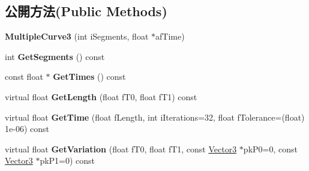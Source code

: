\subsection*{公開方法(Public Methods)}
\begin{DoxyCompactItemize}
\item 
{\bfseries Multiple\+Curve3} (int i\+Segments, float $\ast$af\+Time)\hypertarget{class_magnum_1_1_multiple_curve3_a5ae69e4c6b4875aeac94066085753e32}{}\label{class_magnum_1_1_multiple_curve3_a5ae69e4c6b4875aeac94066085753e32}

\item 
int {\bfseries Get\+Segments} () const \hypertarget{class_magnum_1_1_multiple_curve3_aeac2dfa673e71cad5ff201f934c61839}{}\label{class_magnum_1_1_multiple_curve3_aeac2dfa673e71cad5ff201f934c61839}

\item 
const float $\ast$ {\bfseries Get\+Times} () const \hypertarget{class_magnum_1_1_multiple_curve3_a4c36e2a63268dafb4991299f00a94e8d}{}\label{class_magnum_1_1_multiple_curve3_a4c36e2a63268dafb4991299f00a94e8d}

\item 
virtual float {\bfseries Get\+Length} (float f\+T0, float f\+T1) const \hypertarget{class_magnum_1_1_multiple_curve3_a9aade0b179e52b5bc79334ac36f827ad}{}\label{class_magnum_1_1_multiple_curve3_a9aade0b179e52b5bc79334ac36f827ad}

\item 
virtual float {\bfseries Get\+Time} (float f\+Length, int i\+Iterations=32, float f\+Tolerance=(float) 1e-\/06) const \hypertarget{class_magnum_1_1_multiple_curve3_a30a6194b173e3953996c55ccb3acaba0}{}\label{class_magnum_1_1_multiple_curve3_a30a6194b173e3953996c55ccb3acaba0}

\item 
virtual float {\bfseries Get\+Variation} (float f\+T0, float f\+T1, const \hyperlink{class_magnum_1_1_vector3}{Vector3} $\ast$pk\+P0=0, const \hyperlink{class_magnum_1_1_vector3}{Vector3} $\ast$pk\+P1=0) const \hypertarget{class_magnum_1_1_multiple_curve3_a26e9095f6eeacef72b193093141af954}{}\label{class_magnum_1_1_multiple_curve3_a26e9095f6eeacef72b193093141af954}

\end{DoxyCompactItemize}
